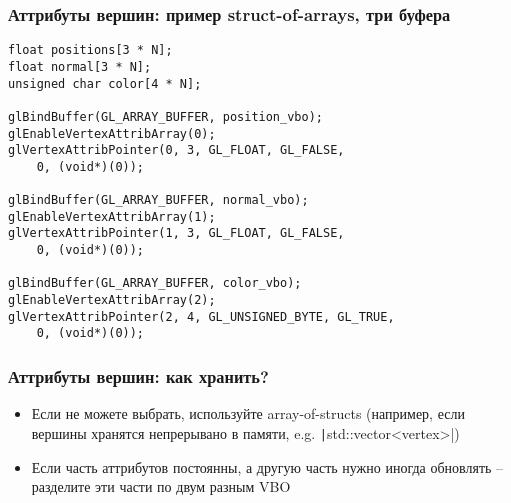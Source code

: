 \documentclass[10pt]{beamer}
\begin{document}
\begin{frame}[fragile]
\frametitle{Аттрибуты вершин: пример struct-of-arrays, три буфера}
\begin{verbatim}
float positions[3 * N];
float normal[3 * N];
unsigned char color[4 * N];

glBindBuffer(GL_ARRAY_BUFFER, position_vbo);
glEnableVertexAttribArray(0);
glVertexAttribPointer(0, 3, GL_FLOAT, GL_FALSE,
    0, (void*)(0));

glBindBuffer(GL_ARRAY_BUFFER, normal_vbo);
glEnableVertexAttribArray(1);
glVertexAttribPointer(1, 3, GL_FLOAT, GL_FALSE,
    0, (void*)(0));

glBindBuffer(GL_ARRAY_BUFFER, color_vbo);
glEnableVertexAttribArray(2);
glVertexAttribPointer(2, 4, GL_UNSIGNED_BYTE, GL_TRUE,
    0, (void*)(0));
\end{verbatim}
\vspace*{-1cm}
\begin{center}
\end{center}
\end{frame}

\begin{frame}[fragile]
\frametitle{Аттрибуты вершин: как хранить?}
\begin{itemize}
\item Если не можете выбрать, используйте array-of-structs (например, если вершины хранятся непрерывано в памяти, e.g. \texttt|std::vector<vertex>|)
\pause
\item Если часть аттрибутов постоянны, а другую часть нужно иногда обновлять -- разделите эти части по двум разным VBO
\end{itemize}
\end{frame}
\end{document}
